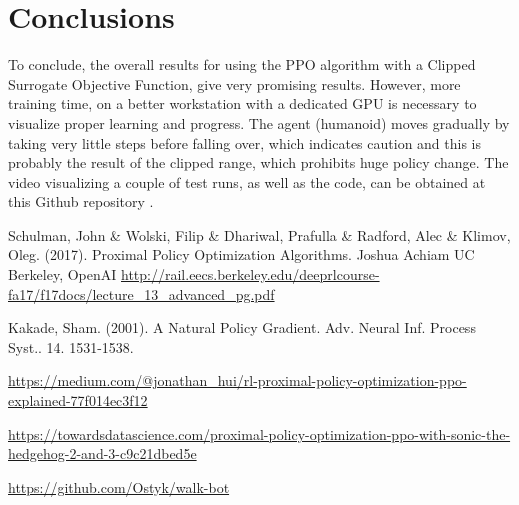 \documentclass[12pt,a4paper]{article}
\begin{document}
\section{Conclusions}

To conclude, the overall results for using the PPO algorithm with a Clipped Surrogate Objective Function, give very promising results. However, more training time, on a better workstation with a dedicated GPU is necessary to visualize proper learning and progress. The agent (humanoid) moves gradually by taking very little steps before falling over, which indicates caution and this is probably the result of the clipped range, which prohibits huge policy change. The video visualizing a couple of test runs, as well as the code, can be obtained at this Github repository \cite{code}.


\begin{thebibliography}{1}

 Schulman, John \& Wolski, Filip \& Dhariwal, Prafulla \& Radford, Alec \& Klimov, Oleg. (2017). Proximal Policy Optimization Algorithms. 
 Joshua Achiam UC Berkeley, OpenAI \url{http://rail.eecs.berkeley.edu/deeprlcourse-fa17/f17docs/lecture_13_advanced_pg.pdf}

 Kakade, Sham. (2001). A Natural Policy Gradient. Adv. Neural Inf. Process Syst.. 14. 1531-1538. 

 \url{https://medium.com/@jonathan_hui/rl-proximal-policy-optimization-ppo-explained-77f014ec3f12}

 \url{https://towardsdatascience.com/proximal-policy-optimization-ppo-with-sonic-the-hedgehog-2-and-3-c9c21dbed5e}

 \url{https://github.com/Ostyk/walk-bot}




\end{thebibliography}
\end{document}
